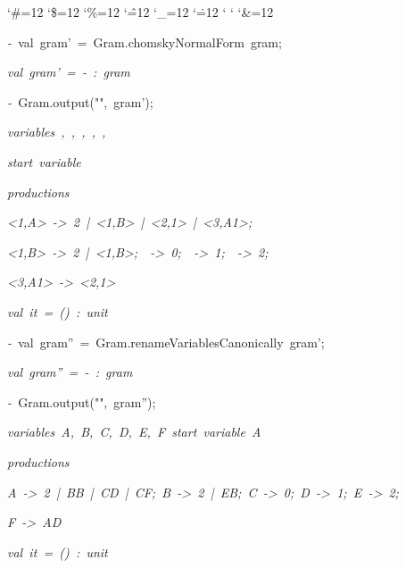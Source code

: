 \begin{list}{}
{\setlength{\leftmargin}{\leftmargini}
\setlength{\rightmargin}{0cm}
\setlength{\itemindent}{0cm}
\setlength{\listparindent}{0cm}
\setlength{\itemsep}{0cm}
\setlength{\parsep}{0cm}
\setlength{\labelsep}{0cm}
\setlength{\labelwidth}{0cm}
\catcode`\#=12
\catcode`\$=12
\catcode`\%=12
\catcode`\^=12
\catcode`\_=12
\catcode`\.=12
\catcode`
\catcode`
\catcode`\&=12
\ttfamily}
\small
\item[]\textsl{-\ }val\ gram'\ =\ Gram.chomskyNormalForm\ gram;
\item[]\textsl{val\ gram'\ =\ -\ :\ gram}
\item[]\textsl{-\ }Gram.output("",\ gram');
\item[]\textsl{variables\ <1,A>,\ <1,B>,\ <2,0>,\ <2,1>,\ <2,2>,\ <3,A1>}
\item[]\textsl{start\ variable\ <1,A>}
\item[]\textsl{productions}
\item[]\textsl{<1,A>\ ->\ 2\ |\ <1,B><1,B>\ |\ <2,0><2,1>\ |\ <2,0><3,A1>;}
\item[]\textsl{<1,B>\ ->\ 2\ |\ <2,2><1,B>;\ <2,0>\ ->\ 0;\ <2,1>\ ->\ 1;\ <2,2>\ ->\ 2;}
\item[]\textsl{<3,A1>\ ->\ <1,A><2,1>}
\item[]\textsl{val\ it\ =\ ()\ :\ unit}
\item[]\textsl{-\ }val\ gram''\ =\ Gram.renameVariablesCanonically\ gram';
\item[]\textsl{val\ gram''\ =\ -\ :\ gram}
\item[]\textsl{-\ }Gram.output("",\ gram'');
\item[]\textsl{variables\ A,\ B,\ C,\ D,\ E,\ F\ start\ variable\ A}
\item[]\textsl{productions}
\item[]\textsl{A\ ->\ 2\ |\ BB\ |\ CD\ |\ CF;\ B\ ->\ 2\ |\ EB;\ C\ ->\ 0;\ D\ ->\ 1;\ E\ ->\ 2;}
\item[]\textsl{F\ ->\ AD}
\item[]\textsl{val\ it\ =\ ()\ :\ unit}
\end{list}
